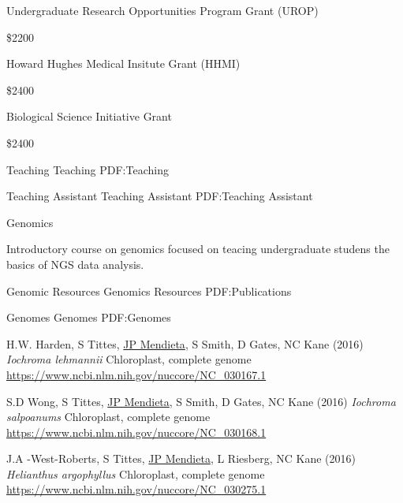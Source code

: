 \documentclass[letterpaper,MMMyyyy,nonstopmode]{simpleresumecv}
\begin{document}
\begin{Body}
\Gap
\BulletItem
Undergraduate Research Opportunities Program Grant (UROP)
\hfill
{}
\begin{Detail}
\Item
\$2200
\end{Detail}


\Gap
\BulletItem
Howard Hughes Medical Insitute Grant (HHMI)
\hfill
{}
\begin{Detail}
\Item
\$2400
\end{Detail}

\Gap
\BulletItem
Biological Science Initiative Grant
\hfill
{}
\begin{Detail}
\Item
\$2400
\end{Detail}



\Section
{Teaching}
{Teaching}
{PDF:Teaching}

\SubSection
{Teaching Assistant}
{Teaching Assistant}
{PDF:Teaching Assistant}

\Gap
\BulletItem
Genomics
\hfill
{}
\begin{Detail}
\Item  Introductory course on genomics focused on teacing undergraduate studens the basics of NGS data analysis.
\end{Detail}




\Section
{Genomic Resources}
{Genomics Resources}
{PDF:Publications}

\SubSection
{Genomes}
{Genomes}
{PDF:Genomes}

\begingroup
\renewcommand{\MaxNumberedItem}{[300]}



\Gap
\NumberedItem{[5]}
{H.W. Harden, S Tittes, \underline{JP Mendieta}, S Smith, D Gates, NC Kane
(2016)
 \textit{ Iochroma lehmannii} Chloroplast, complete genome
\url{https://www.ncbi.nlm.nih.gov/nuccore/NC_030167.1}}


\Gap
\NumberedItem{[4]}
{S.D Wong, S Tittes, \underline{JP Mendieta}, S Smith, D Gates, NC Kane
(2016)
\textit{ Iochroma salpoanums} Chloroplast, complete genome
\url{https://www.ncbi.nlm.nih.gov/nuccore/NC_030168.1}}


\Gap
\NumberedItem{[3]}
{J.A -West-Roberts, S Tittes, \underline{JP Mendieta}, L Riesberg, NC Kane
(2016)
 \textit{Helianthus argophyllus} Chloroplast, complete genome
\url{https://www.ncbi.nlm.nih.gov/nuccore/NC_030275.1}}



\end{Body}
\end{document}
